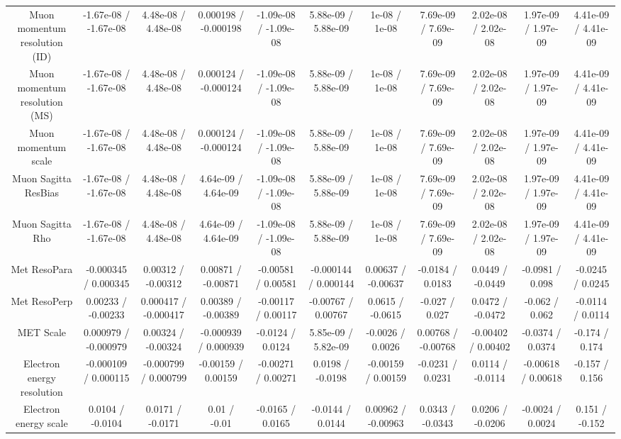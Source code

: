 \begin{table}[htbp]
\begin{center}
\begin{tabular}{|c|c|c|c|c|c|c|c|c|c|c|}
  Muon momentum resolution (ID) & -1.67e-08 / -1.67e-08 & 4.48e-08 / 4.48e-08 & 0.000198 / -0.000198 & -1.09e-08 / -1.09e-08 & 5.88e-09 / 5.88e-09 & 1e-08 / 1e-08 & 7.69e-09 / 7.69e-09 & 2.02e-08 / 2.02e-08 & 1.97e-09 / 1.97e-09 & 4.41e-09 / 4.41e-09 \\ 
  Muon momentum resolution (MS) & -1.67e-08 / -1.67e-08 & 4.48e-08 / 4.48e-08 & 0.000124 / -0.000124 & -1.09e-08 / -1.09e-08 & 5.88e-09 / 5.88e-09 & 1e-08 / 1e-08 & 7.69e-09 / 7.69e-09 & 2.02e-08 / 2.02e-08 & 1.97e-09 / 1.97e-09 & 4.41e-09 / 4.41e-09 \\ 
  Muon momentum scale & -1.67e-08 / -1.67e-08 & 4.48e-08 / 4.48e-08 & 0.000124 / -0.000124 & -1.09e-08 / -1.09e-08 & 5.88e-09 / 5.88e-09 & 1e-08 / 1e-08 & 7.69e-09 / 7.69e-09 & 2.02e-08 / 2.02e-08 & 1.97e-09 / 1.97e-09 & 4.41e-09 / 4.41e-09 \\ 
  Muon Sagitta ResBias & -1.67e-08 / -1.67e-08 & 4.48e-08 / 4.48e-08 & 4.64e-09 / 4.64e-09 & -1.09e-08 / -1.09e-08 & 5.88e-09 / 5.88e-09 & 1e-08 / 1e-08 & 7.69e-09 / 7.69e-09 & 2.02e-08 / 2.02e-08 & 1.97e-09 / 1.97e-09 & 4.41e-09 / 4.41e-09 \\ 
  Muon Sagitta Rho & -1.67e-08 / -1.67e-08 & 4.48e-08 / 4.48e-08 & 4.64e-09 / 4.64e-09 & -1.09e-08 / -1.09e-08 & 5.88e-09 / 5.88e-09 & 1e-08 / 1e-08 & 7.69e-09 / 7.69e-09 & 2.02e-08 / 2.02e-08 & 1.97e-09 / 1.97e-09 & 4.41e-09 / 4.41e-09 \\ 
  Met ResoPara & -0.000345 / 0.000345 & 0.00312 / -0.00312 & 0.00871 / -0.00871 & -0.00581 / 0.00581 & -0.000144 / 0.000144 & 0.00637 / -0.00637 & -0.0184 / 0.0183 & 0.0449 / -0.0449 & -0.0981 / 0.098 & -0.0245 / 0.0245 \\ 
  Met ResoPerp & 0.00233 / -0.00233 & 0.000417 / -0.000417 & 0.00389 / -0.00389 & -0.00117 / 0.00117 & -0.00767 / 0.00767 & 0.0615 / -0.0615 & -0.027 / 0.027 & 0.0472 / -0.0472 & -0.062 / 0.062 & -0.0114 / 0.0114 \\ 
  MET Scale & 0.000979 / -0.000979 & 0.00324 / -0.00324 & -0.000939 / 0.000939 & -0.0124 / 0.0124 & 5.85e-09 / 5.82e-09 & -0.0026 / 0.0026 & 0.00768 / -0.00768 & -0.00402 / 0.00402 & -0.0374 / 0.0374 & -0.174 / 0.174 \\ 
  Electron energy resolution & -0.000109 / 0.000115 & -0.000799 / 0.000799 & -0.00159 / 0.00159 & -0.00271 / 0.00271 & 0.0198 / -0.0198 & -0.00159 / 0.00159 & -0.0231 / 0.0231 & 0.0114 / -0.0114 & -0.00618 / 0.00618 & -0.157 / 0.156 \\ 
  Electron energy scale & 0.0104 / -0.0104 & 0.0171 / -0.0171 & 0.01 / -0.01 & -0.0165 / 0.0165 & -0.0144 / 0.0144 & 0.00962 / -0.00963 & 0.0343 / -0.0343 & 0.0206 / -0.0206 & -0.0024 / 0.0024 & 0.151 / -0.152 \\ 

\end{tabular}
\end{center}
\end{table}
